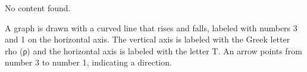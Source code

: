 No content found.

A graph is drawn with a curved line that rises and falls, labeled with numbers 3 and 1 on the horizontal axis. The vertical axis is labeled with the Greek letter rho (ρ) and the horizontal axis is labeled with the letter T. An arrow points from number 3 to number 1, indicating a direction.